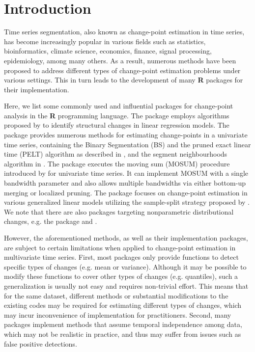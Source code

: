 \section[Intro]{Introduction}\label{sec:intro}
Time series segmentation, also known as change-point estimation in time series, has become increasingly popular in various fields such as statistics, bioinformatics, climate science, economics, finance, signal processing, epidemiology, among many others. As a result, numerous methods have been proposed to address different types of change-point estimation problems under various settings. This in turn  leads to the development of many \textbf{R} packages for their implementation. 


Here, we list some commonly used and influential packages for change-point analysis in the \textbf{R} programming language. The package  \citep{zeileis2002struc} employs algorithms proposed by \cite{zeileis2003cmpstat} to identify structural changes in linear regression models. The package  \citep{changepoint} provides numerous methods for estimating change-points in a univariate time series, containing the Binary Segmentation (BS) and the pruned exact linear time (PELT) algorithm as described in \cite{Killick2012}, and the segment neighbourhoods algorithm in  \cite{auger1989algorithms}. The package  \citep{mosum2021} executes the moving sum (MOSUM) procedure introduced by \cite{eichinger2018mosum} for univariate time series. It can implement MOSUM with a single bandwidth parameter and also allows multiple bandwidths via either bottom-up merging or localized pruning. The package  \citep{wang2022cpss} focuses on change-point estimation in various generalized linear models utilizing the sample-split strategy proposed by \cite{zou2020consistent}. We note that there are also packages targeting nonparametric distributional changes, e.g. the package  \citep{ecp2014} and  \citep{cpm2015}.


However, the aforementioned methods, as well as their implementation packages, are subject to certain limitations when applied to change-point estimation in multivariate time series. First, most packages only provide functions to detect specific types of changes (e.g. mean or variance). { Although it may be possible to modify these functions to cover other types of changes (e.g. quantiles), such a generalization is usually not easy and requires non-trivial effort.} This means that for the same dataset, different methods { or substantial modifications to the existing codes} may be required for estimating different types of changes, which may incur inconvenience of implementation for practitioners.  Second, { many packages implement methods that assume temporal independence among data, which may not be realistic in practice, and thus may suffer from issues such as false positive detections.}

